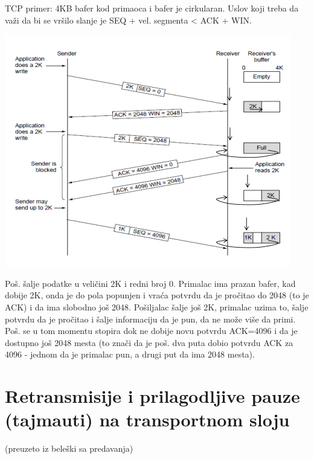 \documentclass{article} %
\begin{document}
TCP primer: 4KB bafer kod primaoca i bafer je cirkularan.
Uslov koji treba da važi da bi se vršilo slanje je SEQ + vel. segmenta < ACK + WIN. 
 \begin{center}
	\includegraphics[scale=0.7]{kontoka3}
\end{center}
Poš. šalje podatke u veličini 2K i redni broj 0. Primalac ima prazan bafer, kad dobije 2K, onda je do pola popunjen i vraća potvrdu da je pročitao do 2048 (to je ACK) i da ima slobodno još 2048. Pošiljalac šalje još 2K, primalac uzima to, šalje potvrdu da je pročitao i šalje informaciju da je pun, da ne može više da primi. Poš. se u tom momentu stopira dok ne dobije novu potvrdu ACK=4096 i da je dostupno još 2048 mesta (to znači da je poš. dva puta dobio potvrdu ACK za 4096 - jednom da je primalac pun, a drugi put da ima 2048 mesta).
\section{Retransmisije i prilagodljive pauze (tajmauti) na transportnom sloju}
(preuzeto iz beleški sa predavanja)\\
\end{document}
